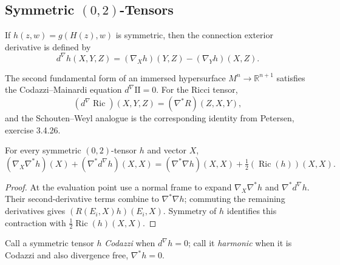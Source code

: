 \subsection{Symmetric $(0,2)$-Tensors}

\begin{definition}
  \label{def:pet-ch9-codazzi-exterior-derivative}
  If $h(z,w)=g(H(z),w)$ is symmetric, then the connection exterior derivative
  is defined by
  \[
    d^\nabla h(X,Y,Z)=(\nabla_Xh)(Y,Z)-(\nabla_Yh)(X,Z).
  \]
\end{definition}

\begin{remark}
  \label{rem:pet-ch9-ricci-codazzi-identity}
  The second fundamental form of an immersed hypersurface
  $M^n\to\mathbb R^{n+1}$ satisfies the Codazzi--Mainardi equation
  $d^\nabla\mathrm{II}=0$. For the Ricci tensor,
  \[
    (d^\nabla\operatorname{Ric})(X,Y,Z)=(\nabla^*R)(Z,X,Y),
  \]
  and the Schouten--Weyl analogue is the corresponding identity from
  Petersen, exercise 3.4.26.
\end{remark}

\begin{theorem}
  \label{thm:pet-ch9-symmetric-tensor-lichnerowicz-identity}
  For every symmetric $(0,2)$-tensor $h$ and vector $X$,
  \[
    (\nabla_X\nabla^*h)(X)+(\nabla^*d^\nabla h)(X,X)
    =(\nabla^*\nabla h)(X,X)+\tfrac12(\operatorname{Ric}(h))(X,X).
  \]
\end{theorem}
\begin{proof}
  \sketch
  At the evaluation point use a normal frame to expand
  \(\nabla_X\nabla^*h\) and \(\nabla^*d^\nabla h\).  Their second-derivative
  terms combine to \(\nabla^*\nabla h\); commuting the remaining derivatives
  gives \((R(E_i,X)h)(E_i,X)\).  Symmetry of \(h\) identifies this contraction
  with \(\tfrac12\operatorname{Ric}(h)(X,X)\).
\end{proof}

\begin{definition}
  \label{def:pet-ch9-codazzi-harmonic-tensor}
  Call a symmetric tensor $h$ \emph{Codazzi} when $d^\nabla h=0$; call it
  \emph{harmonic} when it is Codazzi and also divergence free,
  $\nabla^*h=0$.
\end{definition}

